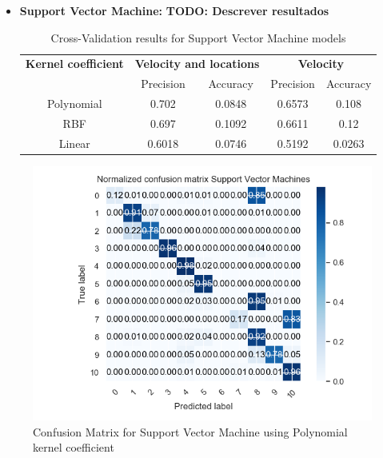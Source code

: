\begin{itemize}
\newpage
\item \textbf{Support Vector Machine: }
\textbf{TODO: Descrever resultados}
\begin {table}[H]
\begin{center}
\begin{tabular}{c|c|c|c|c}
\multicolumn{1}{c|}{\textbf{Kernel coefficient } }   &\multicolumn{2}{c|}{\textbf{ Velocity and locations}}& \multicolumn{2}{c}{\textbf{ Velocity}}\\
&Precision & Accuracy & Precision & Accuracy \\
\hline
Polynomial    &0.702 &0.0848    & 0.6573&0.108\\
RBF     &0.697&0.1092  & 0.6611&0.12\\
Linear  &0.6018&0.0746  & 0.5192&0.0263
\label{table:cross_val_svm}
\end{tabular}
\caption {Cross-Validation results for Support Vector Machine models}
\end{center}
\end {table}

\end{itemize}

\begin{figure}[h]
    \centering
    \includegraphics[width=0.8\linewidth]{Chapters/img/CM_SVM.png}
    \caption{Confusion Matrix for Support Vector Machine using Polynomial kernel coefficient}
    \label{fig:cm_cvm}
\end{figure}


\newpage






